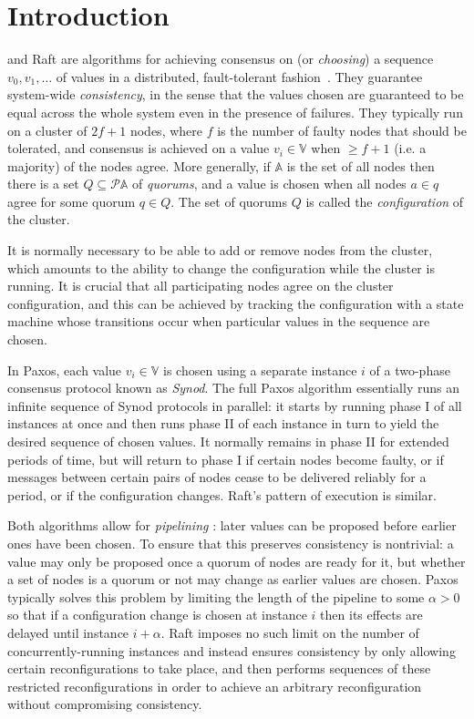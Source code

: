 \documentclass[journal]{IEEEtran}
\begin{document}
\section{Introduction}

 and Raft are algorithms for achieving consensus on (or
\textit{choosing}) a sequence $v_0, v_1, \ldots$ of values in a distributed,
fault-tolerant fashion~\cite{part-time-parliament}. They guarantee system-wide
\textit{consistency}, in the sense that the values chosen are guaranteed to be
equal across the whole system even in the presence of failures. They typically
run on a cluster of $2f+1$ nodes, where $f$ is the number of faulty nodes that
should be tolerated, and consensus is achieved on a value $v_i \in \mathbb V$
when $\ge f+1$ (i.e. a majority) of the nodes agree. More generally, if
$\mathbb A$ is the set of all nodes then there is a set $Q \subseteq \mathcal P
\mathbb A$ of \textit{quorums}, and a value is chosen when all nodes $a \in q$
agree for some quorum $q \in Q$. The set of quorums $Q$ is called the
\textit{configuration} of the cluster.

It is normally necessary to be able to add or remove nodes from the cluster,
which amounts to the ability to change the configuration while the cluster is
running. It is crucial that all participating nodes agree on the cluster
configuration, and this can be achieved by tracking the configuration with a
state machine whose transitions occur when particular values in the sequence
are chosen.

In Paxos, each value $v_i \in \mathbb V$ is chosen using a separate instance
$i$ of a two-phase consensus protocol known as \textit{Synod}. The full Paxos
algorithm essentially runs an infinite sequence of Synod protocols in parallel:
it starts by running phase I of all instances at once and then runs phase II of
each instance in turn to yield the desired sequence of chosen values. It
normally remains in phase II for extended periods of time, but will return to
phase I if certain nodes become faulty, or if messages between certain pairs of
nodes cease to be delivered reliably for a period, or if the configuration
changes. Raft's pattern of execution is similar.

Both algorithms allow for \textit{pipelining} \cite{smart}: later values can be
proposed before earlier ones have been chosen. To ensure that this preserves
consistency is nontrivial: a value may only be proposed once a quorum of nodes
are ready for it, but whether a set of nodes is a quorum or not may change as
earlier values are chosen. Paxos typically solves this problem by limiting the
length of the pipeline to some $\alpha > 0$ so that if a configuration change
is chosen at instance $i$ then its effects are delayed until instance $i +
\alpha$. Raft imposes no such limit on the number of concurrently-running
instances and instead ensures consistency by only allowing certain
reconfigurations to take place, and then performs sequences of these restricted
reconfigurations in order to achieve an arbitrary reconfiguration without
compromising consistency.
\end{document}
